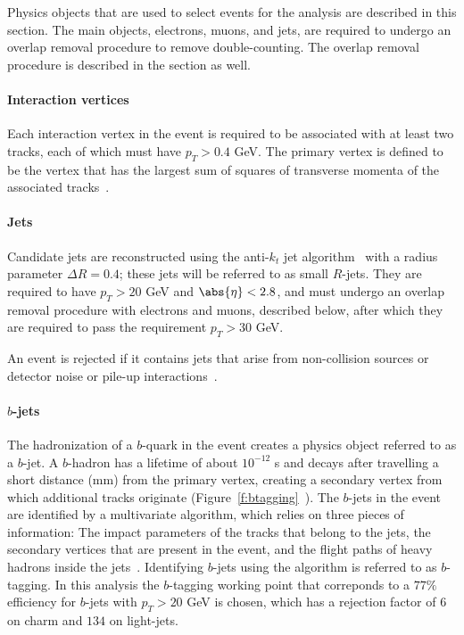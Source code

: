 Physics objects that are used to select events for the analysis are described
in this section. The main objects, electrons, muons, and jets, are required to
undergo an overlap removal procedure to remove double-counting. The overlap 
removal procedure is described in the section as well. 

\paragraph{Interaction vertices} Each interaction vertex in the event is
required to be associated with at least two tracks, each of which must have
$p_T > 0.4$ GeV. The primary vertex is defined to be the vertex that has the
largest sum of squares of transverse momenta of the associated
tracks~\cite{ATL-PHYS-PUB-2015-026}.

\paragraph{Jets} Candidate jets are reconstructed using the anti-$k_t$ jet
algorithm~\cite{PERF-2014-07, Cacciari:2008gp, Cacciari:2011ma} with a radius
parameter $\Delta R = 0.4$; these jets will be referred to as small $R$-jets.
They are required to have $p_T > 20$ GeV and $\abs{\eta} < 2.8$, and must
undergo an overlap removal procedure with electrons and muons, described below,
after which they are required to pass the requirement $p_T > 30$ GeV.

An event is rejected if it contains jets that arise from non-collision sources
or detector noise or pile-up interactions~\cite{ATLAS-CONF-2015-029}.

\paragraph{$b$-jets} The hadronization of a $b$-quark in the event creates a
physics object referred to as a $b$-jet. A $b$-hadron has a lifetime of about
$10^{-12}$ s and decays after travelling a short distance (mm) from the primary
vertex, creating a secondary vertex from which additional tracks originate
(Figure~\ref{f:btagging}~\cite{bjetwiki}). The $b$-jets in the event are
identified by a multivariate algorithm, which relies on three pieces of
information: The impact parameters of the tracks that belong to the jets, the
secondary vertices that are present in the event, and the flight paths of heavy
hadrons inside the jets~\cite{PERF-2012-04,ATL-PHYS-PUB-2016-012}. Identifying
$b$-jets using the algorithm is referred to as $b$-tagging. In this analysis
the $b$-tagging working point that correponds to a $77\%$ efficiency for
$b$-jets with $p_T >20$ GeV is chosen, which has a rejection factor of $6$ on
charm and $134$ on light-jets.

